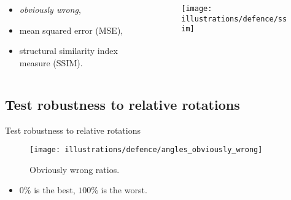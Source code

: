 \documentclass[aspectratio=169,hyperref={pdfpagelabels=false}]{beamer}
\begin{document}
    \begin{frame}
        \begin{columns}
            \begin{column}{.5\textwidth}
                \begin{itemize}
                    \item \textit{obviously wrong},
                    \pause
                    \item mean squared error (MSE),
                    \pause
                    \item structural similarity index measure (SSIM).
                \end{itemize}
            \end{column}%
            \begin{column}{.5\textwidth}
                \begin{figure}
                    \centering
                    \texttt{[image: illustrations/defence/ssim]}
                \end{figure}
            \end{column}%
        \end{columns}
    \end{frame}

    \subsection{Test robustness to relative rotations}
    \begin{frame}{Test robustness to relative rotations}
        \begin{figure}
            \centering
            \texttt{[image: illustrations/defence/angles\_obviously\_wrong]}
            \caption{Obviously wrong ratios.}
        \end{figure}
        \vspace*{-1em}%
        \begin{itemize}
            \item $0\%$ is the best, $100\%$ is the worst.
        \end{itemize}
    \end{frame}
\end{document}
